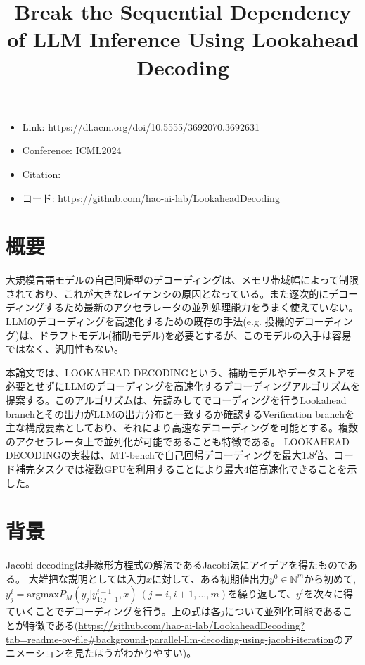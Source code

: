\documentclass[uplatex]{jsarticle}
\title{Break the Sequential Dependency of LLM Inference Using Lookahead Decoding}
\author{\empty}
\date{\empty}
\theoremstyle{remark}
\newenvironment{background}[1]{
    \begin{tcolorbox}[
        fonttitle=\bfseries,
        title={#1}
    ]
}{
    \end{tcolorbox}
}
\begin{document}
\maketitle

\begin{itemize}
    \item Link: \url{https://dl.acm.org/doi/10.5555/3692070.3692631}
    \item Conference: ICML2024
    \item Citation: \cite{lookahead_decoding}
    \item コード: \url{https://github.com/hao-ai-lab/LookaheadDecoding}
\end{itemize}

\section{概要}
\begin{tcolorbox}[fonttitle=\bfseries]
大規模言語モデルの自己回帰型のデコーディングは、メモリ帯域幅によって制限されており、これが大きなレイテンシの原因となっている。また逐次的にデコーディングするため最新のアクセラレータの並列処理能力をうまく使えていない。LLMのデコーディングを高速化するための既存の手法(e.g. 投機的デコーディング)は、ドラフトモデル(補助モデル)を必要とするが、このモデルの入手は容易ではなく、汎用性もない。

本論文では、LOOKAHEAD DECODINGという、補助モデルやデータストアを必要とせずにLLMのデコーディングを高速化するデコーディングアルゴリズムを提案する。このアルゴリズムは、先読みしてでコーディングを行うLookahead branchとその出力がLLMの出力分布と一致するか確認するVerification branchを主な構成要素としており、それにより高速なデコーディングを可能とする。複数のアクセラレータ上で並列化が可能であることも特徴である。
LOOKAHEAD DECODINGの実装は、MT-benchで自己回帰デコーディングを最大1.8倍、コード補完タスクでは複数GPUを利用することにより最大4倍高速化できることを示した。

\end{tcolorbox}

\section{背景}
\begin{background}{Jacobi Decoding}
Jacobi decodingは非線形方程式の解法であるJacobi法にアイデアを得たものである。
大雑把な説明としては入力$x$に対して、ある初期値出力$y^0 \in \mathbb{N}^m$から初めて, 
$y_j^i = \mathrm{argmax} P_M(y_j| y_{1:j-1}^{i-1}, x)\ (j = i, i+1, \dots, m)$を繰り返して、$y^i$を次々に得ていくことでデコーディングを行う。上の式は各$j$について並列化可能であることが特徴である(\url{https://github.com/hao-ai-lab/LookaheadDecoding?tab=readme-ov-file#background-parallel-llm-decoding-using-jacobi-iteration}のアニメーションを見たほうがわかりやすい)。
\end{background}
\end{document}

